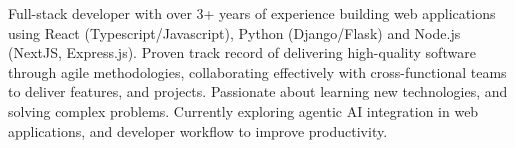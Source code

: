 

\begin{cvparagraph}

Full-stack developer with over 3+ years of experience building web applications using React (Typescript/Javascript), Python (Django/Flask) and Node.js (NextJS, Express.js). Proven track record of delivering high-quality software through agile methodologies, collaborating effectively with cross-functional teams to deliver features, and projects. Passionate about learning new technologies, and solving complex problems. Currently exploring agentic AI integration in web applications, and developer workflow to improve productivity.

\end{cvparagraph}
